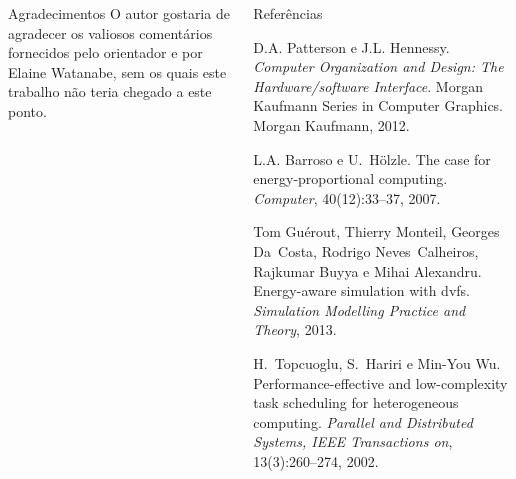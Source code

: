 \documentclass[final]{beamer}
\begin{document}
\begin{frame}[t]
\begin{columns}[t] 
	\begin{column}{0.35\columnwidth}

		\begin{block}{Agradecimentos}
			O autor gostaria de agradecer os valiosos comentários fornecidos
			pelo orientador e por Elaine Watanabe, sem os quais este trabalho
			não teria chegado a este ponto.
		\end{block}
		
	\end{column}

	\begin{column}{0.61\columnwidth}
		\begin{block}{Referências}
			\footnotesize{\begin{thebibliography}{99}
			D.A. Patterson e J.L. Hennessy. {\em Computer Organization and Design: The Hardware/software
			  Interface}. Morgan Kaufmann Series in Computer Graphics. Morgan Kaufmann, 2012.

			L.A. Barroso e U.~H\"olzle.
			The case for energy-proportional computing.
			{\em Computer}, 40(12):33--37, 2007.

			Tom Gu{\'e}rout, Thierry Monteil, Georges Da~Costa, Rodrigo Neves~Calheiros,
			  Rajkumar Buyya e Mihai Alexandru.
			Energy-aware simulation with dvfs.
			{\em Simulation Modelling Practice and Theory}, 2013.

			H.~Topcuoglu, S.~Hariri e Min-You Wu.
			Performance-effective and low-complexity task scheduling for
			  heterogeneous computing.
			{\em Parallel and Distributed Systems, IEEE Transactions on},
			  13(3):260--274, 2002.

			\end{thebibliography}}

		\end{block}
	\end{column}
\end{columns}


\end{frame}
\end{document}
